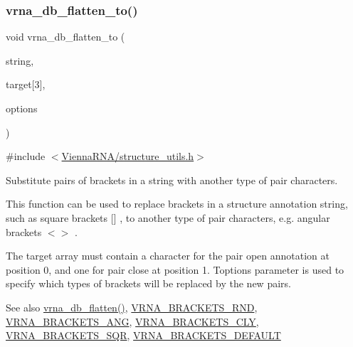 \subsubsection{\texorpdfstring{vrna\+\_\+db\+\_\+flatten\+\_\+to()}{vrna\_db\_flatten\_to()}}
{\footnotesize\ttfamily void vrna\+\_\+db\+\_\+flatten\+\_\+to (\begin{DoxyParamCaption}\item[{char $\ast$}]{string,  }\item[{const char}]{target\mbox{[}3\mbox{]},  }\item[{unsigned int}]{options }\end{DoxyParamCaption})}



{\ttfamily \#include $<$\mbox{\hyperlink{structure__utils_8h}{Vienna\+R\+N\+A/structure\+\_\+utils.\+h}}$>$}



Substitute pairs of brackets in a string with another type of pair characters. 

This function can be used to replace brackets in a structure annotation string, such as square brackets  \mbox{[}\mbox{]}  , to another type of pair characters, e.\+g. angular brackets  $<$$>$ .

The {\ttfamily target} array must contain a character for the \textquotesingle{}pair open\textquotesingle{} annotation at position 0, and one for \textquotesingle{}pair close\textquotesingle{} at position 1. T{\ttfamily options} parameter is used to specify which types of brackets will be replaced by the new pairs.

\begin{DoxySeeAlso}{See also}
\mbox{\hyperlink{group__struct__utils_gae966b9f44168a4f4b39ca42ffb5f37b7}{vrna\+\_\+db\+\_\+flatten()}}, \mbox{\hyperlink{group__struct__utils_gac92d5fa7c6625bce2670ece510a24fbd}{V\+R\+N\+A\+\_\+\+B\+R\+A\+C\+K\+E\+T\+S\+\_\+\+R\+ND}}, \mbox{\hyperlink{group__struct__utils_ga863e03f7f73f10fc9bbcbefbdda4bec8}{V\+R\+N\+A\+\_\+\+B\+R\+A\+C\+K\+E\+T\+S\+\_\+\+A\+NG}}, \mbox{\hyperlink{group__struct__utils_gaf41be40e79cb756c4e0bb8edb4d803d2}{V\+R\+N\+A\+\_\+\+B\+R\+A\+C\+K\+E\+T\+S\+\_\+\+C\+LY}}, \mbox{\hyperlink{group__struct__utils_ga60525d61d7496eeea490a37f3d6bf757}{V\+R\+N\+A\+\_\+\+B\+R\+A\+C\+K\+E\+T\+S\+\_\+\+S\+QR}}, \mbox{\hyperlink{group__struct__utils_ga559ebf76b1b289f85309f4206e99aa1a}{V\+R\+N\+A\+\_\+\+B\+R\+A\+C\+K\+E\+T\+S\+\_\+\+D\+E\+F\+A\+U\+LT}}
\end{DoxySeeAlso}

